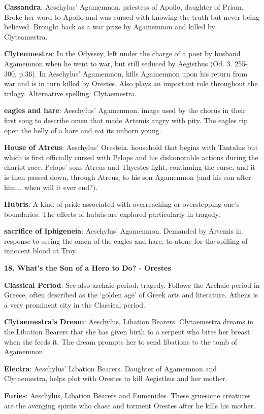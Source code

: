 \documentclass{scrartcl}
\begin{document}
\begin{multicols*}{3}
{\bf Cassandra}: Aeschylus' Agamemnon. priestess of Apollo, daughter of Priam. Broke her word to Apollo and was cursed with knowing the truth but never being believed. Brought back as a war prize by Agamemnon and killed by Clyteamestra.

{\bf Clytemnestra}: In the Odyssey, left under the charge of a poet by husband Agamemnon when he went to war, but still seduced by Aegisthus (Od. 3. 255-300, p.36). In Aeschylus' Agamemnon, kills Agamemnon upon his return from war and is in turn killed by Orestes. Also plays an important role throughout the trilogy. Alternative spelling: Clytaemestra.

{\bf eagles and hare}: Aeschylus' Agamemnon. image used by the chorus in their first song to describe omen that made Artemis angry with pity. The eagles rip open the belly of a hare and eat its unborn young.

{\bf House of Atreus}: Aeschylus' Oresteia. household that begins with Tantalus but which is first officially cursed with Pelops and his dishonorable actions during the chariot race. Pelops' sons Atreus and Thyestes fight, continuing the curse, and it is then passed down, through Atreus, to his son Agamemnon (and his son after him... when will it ever end?).

{\bf Hubris}: A kind of pride associated with overreaching or overstepping one's boundaries. The effects of hubris are explored particularly in tragedy.

{\bf sacrifice of Iphigeneia}: Aeschylus' Agamemnon. Demanded by Artemis in response to seeing the omen of the eagles and hare, to atone for the spilling of innocent blood at Troy.


{\bf 18. What's the Son of a Hero to Do? - Orestes}

{\bf Classical Period}: See also archaic period; tragedy. Follows the Archaic period in Greece, often described as the `golden age' of Greek arts and literature. Athens is a very prominent city in the Classical period.

{\bf Clytaemestra's Dream}: Aeschylus, Libation Bearers. Clytaemestra dreams in the Libation Bearers that she has given birth to a serpent who bites her breast when she feeds it. The dream prompts her to send libations to the tomb of Agamemnon

{\bf Electra}: Aeschylus' Libation Bearers. Daughter of Agamemnon and Clytaemestra, helps plot with Orestes to kill Aegisthus and her mother.

{\bf Furies}: Aeschylus, Libation Bearers and Eumenides. These gruesome creatures are the avenging spirits who chase and torment Orestes after he kills his mother.


\end{multicols*}
\end{document}
